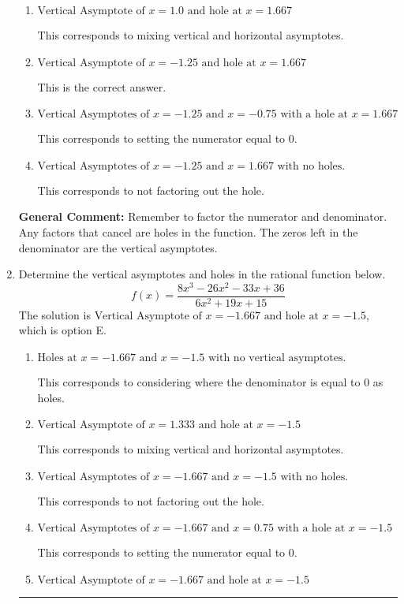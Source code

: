 \documentclass{extbook}[14pt]
\newcommand{\litem}[1]{\item #1

\rule{\textwidth}{0.4pt}}
\begin{document}
\begin{enumerate}
{\begin{enumerate}[label=\Alph*.]
This corresponds to considering where the denominator is equal to 0 as holes.
\item \( \text{Vertical Asymptote of } x = 1.0 \text{ and hole at } x = 1.667 \)

This corresponds to mixing vertical and horizontal asymptotes.
\item \( \text{Vertical Asymptote of } x = -1.25 \text{ and hole at } x = 1.667 \)

This is the correct answer.
\item \( \text{Vertical Asymptotes of } x = -1.25 \text{ and } x = -0.75 \text{ with a hole at } x = 1.667 \)

This corresponds to setting the numerator equal to 0.
\item \( \text{Vertical Asymptotes of } x = -1.25 \text{ and } x = 1.667 \text{ with no holes.} \)

This corresponds to not factoring out the hole.
\end{enumerate}

\textbf{General Comment:} Remember to factor the numerator and denominator. Any factors that cancel are holes in the function. The zeros left in the denominator are the vertical asymptotes.
}
\litem{
Determine the vertical asymptotes and holes in the rational function below.
\[ f(x) = \frac{8x^{3} -26 x^{2} -33 x + 36}{6x^{2} +19 x + 15} \]The solution is \( \text{Vertical Asymptote of } x = -1.667 \text{ and hole at } x = -1.5 \), which is option E.\begin{enumerate}[label=\Alph*.]
\item \( \text{Holes at } x = -1.667 \text{ and } x = -1.5 \text{ with no vertical asymptotes.} \)

This corresponds to considering where the denominator is equal to 0 as holes.
\item \( \text{Vertical Asymptote of } x = 1.333 \text{ and hole at } x = -1.5 \)

This corresponds to mixing vertical and horizontal asymptotes.
\item \( \text{Vertical Asymptotes of } x = -1.667 \text{ and } x = -1.5 \text{ with no holes.} \)

This corresponds to not factoring out the hole.
\item \( \text{Vertical Asymptotes of } x = -1.667 \text{ and } x = 0.75 \text{ with a hole at } x = -1.5 \)

This corresponds to setting the numerator equal to 0.
\item \( \text{Vertical Asymptote of } x = -1.667 \text{ and hole at } x = -1.5 \)


\end{enumerate}}
\end{enumerate}
\end{document}
